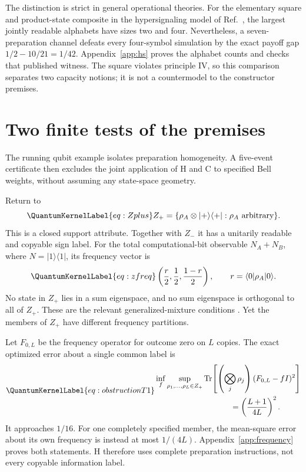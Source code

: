\documentclass[a4paper,11pt,twocolumn,unpublished]{quantumarticle}
\let\label\QuantumKernelLabel
\DeclareMathOperator{\Tr}{Tr}
\newcommand{\ket}[1]{\lvert #1\rangle}
\newcommand{\bra}[1]{\langle #1\rvert}
\begin{document}
The distinction is strict in general operational theories. For the elementary square and product-state composite in the hypersignaling model of Ref.~\cite{hs}, the largest jointly readable alphabets have sizes two and four. Nevertheless, a seven-preparation channel defeats every four-symbol simulation by the exact payoff gap $1/2-10/21=1/42$. Appendix~\ref{app:hs} proves the alphabet counts and checks that published witness. The square violates principle IV, so this comparison separates two capacity notions; it is not a countermodel to the constructor premises.

\section{Two finite tests of the premises}
The running qubit example isolates preparation homogeneity. A five-event certificate then excludes the joint application of H and C to specified Bell weights, without assuming any state-space geometry.

Return to
\begin{equation}\label{eq:Zplus}
 Z_+=\{\rho_A\otimes\ket+\bra+ :\rho_A\text{ arbitrary}\}.
\end{equation}
This is a closed support attribute. Together with $Z_-$ it has a unitarily readable and copyable sign label. For the total computational-bit observable $N_A+N_B$, where $N=\ket1\bra1$, its frequency vector is
\begin{equation}\label{eq:zfreq}
 \left(\frac r2,\frac12,\frac{1-r}2\right),\qquad r=\bra0\rho_A\ket0.
\end{equation}
No state in $Z_+$ lies in a sum eigenspace, and no sum eigenspace is orthogonal to all of $Z_+$. These are the relevant generalized-mixture conditions \cite[Sec.~3, ``Generalised mixtures'', pp.~17--18]{ctp}. Yet the members of $Z_+$ have different frequency partitions.

Let $F_{0,L}$ be the frequency operator for outcome zero on $L$ copies. The exact optimized error about a single common label is
\begin{equation}\label{eq:obstructionT1}
 \begin{aligned}
 &\inf_f\sup_{\rho_1,\ldots,\rho_L\in Z_+}
 \Tr\!\left[\left(\bigotimes_j\rho_j\right)(F_{0,L}-fI)^2\right]\\
 &\hspace{34mm}=\left(\frac{L+1}{4L}\right)^2.
 \end{aligned}
\end{equation}
It approaches $1/16$. For one completely specified member, the mean-square error about its own frequency is instead at most $1/(4L)$. Appendix~\ref{app:frequency} proves both statements. H therefore uses complete preparation instructions, not every copyable information label.
\end{document}
